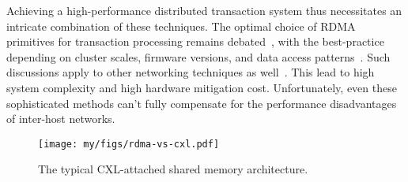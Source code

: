 Achieving a high-performance distributed transaction system thus necessitates an intricate combination of these techniques. The optimal choice of RDMA primitives for transaction processing remains debated~\cite{farm, fasst, grappa_atc15, compromise, drtmh, drtm, storm_systor19, prism_sosp21, guideline_atc16}, with the best-practice depending on cluster scales, firmware versions, and data access patterns~\cite{drtmh, prism_sosp21, guideline_atc16}. Such discussions apply to other networking techniques as well~\cite{smartnic_osdi23, xenic_sosp21}. This lead to high system complexity and high hardware mitigation cost. Unfortunately, even these sophisticated methods can't fully compensate for the performance disadvantages of inter-host networks. 


\begin{figure}[t]
  \centering 
  \texttt{[image: my/figs/rdma-vs-cxl.pdf]}
  \caption{The typical CXL-attached shared memory architecture.}
  \label{fig:motivation-rdma-vs-cxl}
\end{figure}
